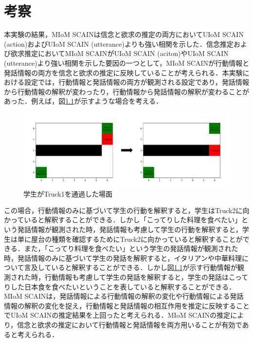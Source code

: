 \chapter{考察}
\par
本実験の結果，MIoM SCAINは信念と欲求の推定の両方においてUIoM SCAIN (action)およびUIoM SCAIN (utterance)よりも強い相関を示した．信念推定および欲求推定においてMIoM SCAINがUIoM SCAIN (aciton)やUIoM SCAIN (utterance)より強い相関を示した要因の一つとして，MIoM SCAINが行動情報と発話情報の両方を信念と欲求の推定に反映していることが考えられる．本実験における設定では，行動情報と発話情報の両方が観測される設定であり，発話情報から行動情報の解釈が変わったり，行動情報から発話情報の解釈が変わることがあった．例えば，図\ref{fig:ex_env2}が示すような場合を考える．
\begin{figure}[htbp]
  \begin{center}
    \includegraphics[scale=0.48]{./ex_env2.pdf}
    \caption{学生がTruck1を通過した場面}
    \label{fig:ex_env2}
  \end{center}
\end{figure}
この場合，行動情報のみに基づいて学生の行動を解釈すると，学生はTruck2に向かっていると解釈することができる．しかし「こってりした料理を食べたい」という発話情報が観測された時，発話情報も考慮して学生の行動を解釈すると，学生は単に屋台の種類を確認するためにTruck2に向かっていると解釈することができる．また，「こってり料理を食べたい」という学生の発話情報が観測された時，発話情報のみに基づいて学生の発話を解釈すると，イタリアンや中華料理について言及していると解釈することができる．しかし図\ref{fig:ex_env2}が示す行動情報が観測された時，行動情報も考慮して学生の発話を解釈すると，学生の発話はこってりした日本食を食べたいということを表していると解釈することができる．
MIoM SCAINは，発話情報による行動情報の解釈の変化や行動情報による発話情報の解釈の変化を捉え，行動情報と発話情報の相互作用を推定に反映することでUIoM SCAINの推定結果を上回ったと考えられる．MIoM SCAINの推定により，信念と欲求の推定において行動情報と発話情報を両方用いることが有効であると考えられる．


